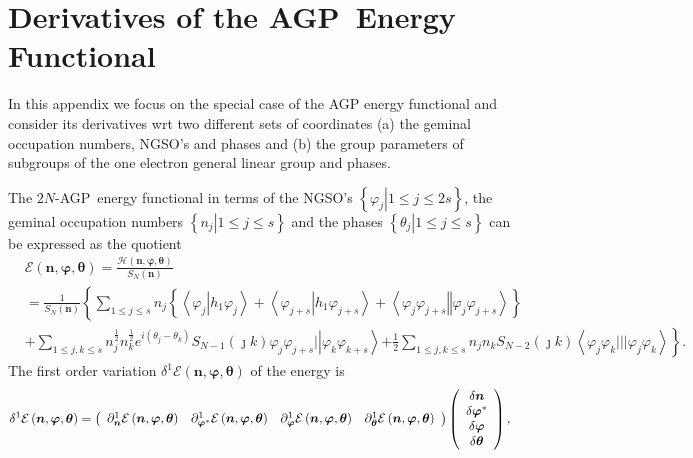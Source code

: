 \documentclass[titlepage]{article}%
\begin{document}
\section{Derivatives of the AGP\ Energy Functional\label{variational}}

In this appendix we focus on the special case of the AGP energy functional and
consider its derivatives wrt two different sets of coordinates (a) the geminal
occupation numbers, NGSO's and phases and (b) the group parameters of
subgroups of the one electron general linear group and phases.

The $2N$-AGP\ energy functional in terms of the NGSO's $\left\{  \left.
\varphi_{j}\right\vert 1\leq j\leq2s\right\}  $, the geminal occupation
numbers $\left\{  \left.  n_{j}\right\vert 1\leq j\leq s\right\}  $ and the
phases $\left\{  \left.  \theta_{j}\right\vert 1\leq j\leq s\right\}  $ can be
expressed as the quotient%
\begin{align}
&  \mathcal{E}\left(  \bm{n},\bm{\varphi},\bm{\theta}\right)  =\frac
{\mathcal{H}\left(  \bm{n},\bm{\varphi},\bm{\theta}\right)  }{S_{N}\left(
\bm{n}\right)  }\nonumber\\
&  =\frac{1}{S_{N}\left(  \bm{n}\right)  }\left\{  \sum_{1\leq j\leq s}%
n_{j}\left\{  \left\langle \varphi_{j}\left\vert h_{1}\varphi_{j}\right.
\right\rangle +\left\langle \varphi_{j+s}\left\vert h_{1}\varphi_{j+s}\right.
\right\rangle +\left\langle \varphi_{j}\varphi_{j+s}\left\Vert \varphi
_{j}\varphi_{j+s}\right.  \right\rangle \right\}  \right. \nonumber\\
&  +\sum_{1\leq j,k\leq s}n_{j}^{\frac{1}{2}}n_{k}^{\frac{1}{2}}e^{i\left(
\theta_{j}-\theta_{k}\right)  }S_{N-1}\left(  \jmath k\right)  \varphi
_{j}\varphi_{j+s}|\left\vert \varphi_{k}\varphi_{k+s}\right\rangle \left.
+\frac{1}{2}\sum_{1\leq j,k\leq s}n_{j}n_{k}S_{N-2}\left(  \jmath k\right)
\left\langle \varphi_{j}\varphi_{k}|||\varphi_{j}\varphi_{k}\right\rangle
\right\}  .
\end{align}
The first order variation $\delta^{1}\mathcal{E}\left(
\bm{n},\bm{\varphi},\bm{\theta}\right)  $ of the energy is
\begin{equation}
\delta^{1}\mathcal{E}\left(  \bm{n},\bm{\varphi},\bm{\theta }\right)  =\left(
%
\begin{array}
[c]{cccc}%
\partial_{\bm{n}}^{1}\mathcal{E}\left(
\bm{n},\bm{\varphi },\bm{\theta}\right)  & \partial_{\bm{\varphi}^{\ast}}%
^{1}\mathcal{E}\left(  \bm{n},\bm{\varphi},\bm{\theta}\right)  &
\partial_{\bm{\varphi}}^{1}\mathcal{E}\left(
\bm{n},\bm{\varphi },\bm{\theta}\right)  & \partial_{\bm{\theta}}%
^{1}\mathcal{E}\left(  \bm{n},\bm{\varphi},\bm{\theta}\right)
\end{array}
\right)  \left(
\begin{array}
[c]{c}%
\delta\bm{n}\\
\delta\bm{\varphi}^{\ast}\\
\delta\bm{\varphi}\\
\delta\bm{\theta}
\end{array}
\right)  ,
\end{equation}
\end{document}
